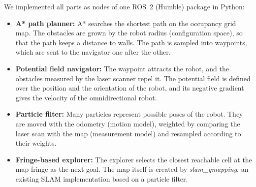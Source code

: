 \documentclass[../report.tex]{subfiles}
\begin{document}
    We implemented all parts as nodes of one ROS~2 (Humble) package in Python:
    \begin{itemize}
        \item \textbf{A* path planner:} A* searches the shortest path on the occupancy grid map. The obstacles are grown by the robot radius (configuration space), so that the path keeps a distance to walls. The path is sampled into waypoints, which are sent to the navigator one after the other.
        \item \textbf{Potential field navigator:} The waypoint attracts the robot, and the obstacles measured by the laser scanner repel it. The potential field is defined over the position and the orientation of the robot, and its negative gradient gives the velocity of the omnidirectional robot.
        \item \textbf{Particle filter:} Many particles represent possible poses of the robot. They are moved with the odometry (motion model), weighted by comparing the laser scan with the map (measurement model) and resampled according to their weights.
        \item \textbf{Fringe-based explorer:} The explorer selects the closest reachable cell at the map fringe as the next goal. The map itself is created by \emph{slam\_gmapping}, an existing SLAM implementation based on a particle filter.
    \end{itemize}
\end{document}
